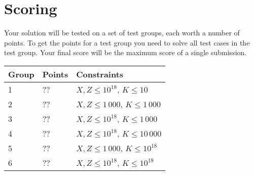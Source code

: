 \section*{Scoring}
Your solution will be tested on a set of test groups, each worth a number of points.
To get the points for a test group you need to solve all test cases in the test group.
Your final score will be the maximum score of a single submission.

\noindent
\begin{tabular}{| l | l | l |}
\hline
Group & Points & Constraints \\ \hline
1     & ??      & $X, Z \le 10^{18}$, $K \le 10$ \\ \hline
2     & ??      & $X, Z \le 1\,000$, $K \le 1\,000$ \\ \hline
3     & ??      & $X, Z \le 10^{18}$, $K \le 1\,000$ \\ \hline
4     & ??      & $X, Z \le 10^{18}$, $K \le 10\,000$ \\ \hline
5     & ??     & $X, Z \le 1\,000$, $K \le 10^{18}$ \\ \hline
6     & ??     & $X, Z \le 10^{18}$, $K \le 10^{18}$ \\ \hline
\end{tabular}
